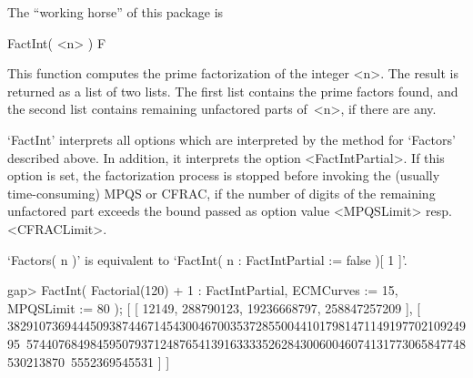 The ``working horse'' of this package is


\>FactInt( <n> ) F

This function computes the prime factorization of the integer <n>.
The result is returned as a list of two lists. The first list
contains the prime factors found, and the second list contains remaining 
unfactored parts of~<n>, if there are any.

`FactInt' interprets all options which are interpreted by the method
for `Factors' described above. In addition, it interprets the option
<FactIntPartial>. If this option is set, the factorization process is
stopped before invoking the (usually time-consuming) MPQS or CFRAC,
if the number of digits of the remaining unfactored part exceeds the
bound passed as option value <MPQSLimit> resp. <CFRACLimit>.

`Factors( n )' is equivalent to
`FactInt( n : FactIntPartial := false )[ 1 ]'.

\beginexample
gap> FactInt( Factorial(120) + 1 : FactIntPartial, ECMCurves := 15, MPQSLimit := 80 );
[ [ 12149, 288790123, 19236668797, 258847257209 ], 
  [ 38291073694445093874467145430046700353728550044101798147114919770210924995\
574407684984595079371248765413916333352628430060046074131773065847748530213870\
5552369545531 ] ]
\endexample

